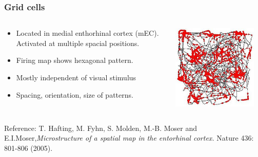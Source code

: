 \documentclass[mathserif]{beamer}
\begin{document}
%
%
%
\begin{frame}
\frametitle{Grid cells}
\begin{columns}[T]
    \begin{column}{.5\textwidth}
			\begin{itemize}
			\item Located in  medial enthorhinal cortex (mEC). Activated at multiple spacial positions. 
			\item Firing map shows hexagonal pattern. 
			\item Mostly independent of visual stimulus
			\item Spacing, orientation, size of  patterns.
			\end{itemize}
    \end{column}
    \begin{column}{.5\textwidth}
    \includegraphics[width= 0.9\textwidth]{RatRunningPath.JPG}
    \end{column}
  \end{columns}
 {\small Reference: \newline
 T. Hafting, M. Fyhn, S. Molden, M.-B. Moser and E.I.Moser,\textit{Microstructure of a spatial map in the entorhinal cortex.} Nature 436: 801-806 (2005).	}
\end{frame}
%
%
\end{document}
